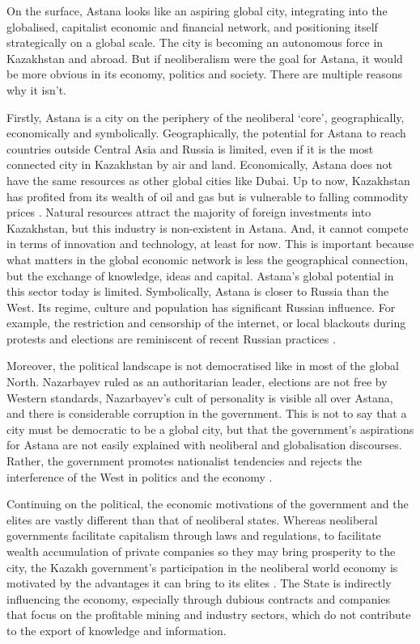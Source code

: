 \documentclass{article}
\begin{document}
On the surface, Astana looks like an aspiring global city, integrating into the globalised, capitalist economic and financial network, and positioning itself strategically on a global scale. The city is becoming an autonomous force in Kazakhstan and abroad.
But if neoliberalism were the goal for Astana, it would be more obvious in its economy, politics and society. There are multiple reasons why it isn't.

Firstly, Astana is a city on the periphery of the neoliberal `core', geographically, economically and symbolically.  
Geographically, the potential for Astana to reach countries outside Central Asia and Russia is limited, even if it is the most connected city in Kazakhstan by air and land.
Economically, Astana does not have the same resources as other global cities like Dubai. Up to now, Kazakhstan has profited from its wealth of oil and gas but is vulnerable to falling commodity prices \parencite{batsaikhan2017central}. Natural resources attract the majority of foreign investments into Kazakhstan, but this industry is non-existent in Astana. And, it cannot compete in terms of innovation and technology, at least for now.
This is important because what matters in the global economic network is less the geographical connection, but the exchange of knowledge, ideas and capital. Astana's global potential in this sector today is limited.
Symbolically, Astana is closer to Russia than the West. Its regime, culture and population has significant Russian influence. For example, the restriction and censorship of the internet, or local blackouts during protests and elections are reminiscent of recent Russian practices \parencite{freedomhouse2021}.

Moreover, the political landscape is not democratised like in most of the global North. Nazarbayev ruled as an authoritarian leader, elections are not free by Western standards, Nazarbayev's cult of personality is visible all over Astana, and there is considerable corruption in the government. This is not to say that a city must be democratic to be a global city, but that the government's aspirations for Astana are not easily explained with neoliberal and globalisation discourses. Rather, the government promotes nationalist tendencies and rejects the interference of the West in politics and the economy \parencite{koch2013not}. 

Continuing on the political, the economic motivations of the government and the elites are vastly different than that of neoliberal states. Whereas neoliberal governments facilitate capitalism through laws and regulations, to facilitate wealth accumulation of private companies so they may bring prosperity to the city, the Kazakh government's participation in the neoliberal world economy is motivated by the advantages it can bring to its elites \parencite{gallo2021three}. The State is indirectly influencing the economy, especially through dubious contracts and companies that focus on the profitable mining and industry sectors, which do not contribute to the export of knowledge and information.
\end{document}
